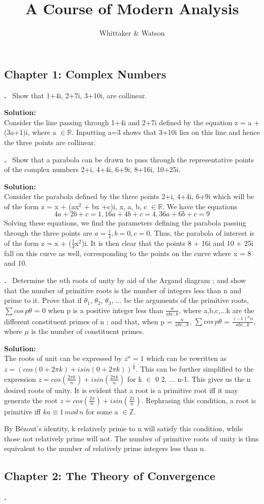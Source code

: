 \documentclass{article}
\date{}
\title{A Course of Modern Analysis}
\author{Whittaker \& Watson}
\newcommand{\R}{\mathbb{R}}
\newcounter{problem}
\newcounter{solution}
\newcommand\Problem{%
  \stepcounter{problem}%
  \textbf{\theproblem.}~%
  \setcounter{solution}{0}%
}
\newcommand\TheSolution{%
  \textbf{Solution:}\\%
}
\begin{document}
\maketitle
\subsection*{Chapter 1: Complex Numbers}
\Problem Show that 1+4i, 2+7i, 3+10i, are collinear.

\TheSolution Consider the line passing through 1+4i and 2+7i defined by the equation z = a + (3a+1)i, where a $\in\R$. Inputting a=3 shows that 3+10i lies on this line and hence the three points are collinear.

\Problem Show that a parabola can be drawn to pass through the representative points of the complex numbers 2+i, 4+4i, 6+9i, 8+16i, 10+25i.

\TheSolution Consider the parabola defined by the three points 2+i, 4+4i, 6+9i which will be of the form z = x + (ax$^2$ + bx +c)i, x, a, b, c $\in\R$. We have the equations
\[ 4a+2b+c = 1,  
16a + 4b +c = 4,  
36a + 6b + c = 9
\]
Solving these equations, we find the parameters defining the parabola passing through the three points are $a = \frac{1}{4}, b = 0, c= 0$. Thus, the parabola of interest is of the form z = x + ($\frac{1}{4}$x$^2$)i. It is then clear that the points 8 + 16i and 10 + 25i fall on this curve as well, corresponding to the points on the curve where x = 8 and 10.

\Problem Determine the $n$th roots of unity by aid of the Argand diagram ; and show that the number of primitive roots is the number of integers less than n and prime to it. Prove that if $\theta_1$, $\theta_2$, $\theta_3$, ... be the arguments of the primitive roots, $\sum cos\,p\theta$ = 0 when p is a positive integer less than $\frac{n}{abc..k}$, where a,b,c,...k are the different constituent primes of n ; and that, when p = $\frac{n}{abc...k}$, $\sum cos\,p\theta$ = $\frac{(-1)^\mu n}{abc...k}$, where $\mu$ is the number of constituent primes.

\TheSolution  The roots of unit can be expressed by $z^n = 1$ which can be rewritten as $z = (cos (0+2\pi k)+ i sin(0+2\pi k))^\frac{1}{n}$. This can be further simplified to the expression $z = cos(\frac{2\pi k}{n}) + i sin(\frac{2\pi k}{n})$ for k $\in$ 0 2, ... n-1. This gives us the n desired roots of unity. It is evident that a root is a primitive root iff it may generate the root $z = cos(\frac{2\pi }{n}) + i sin(\frac{2\pi }{n})$. Rephrasing this condition, a root is primitive iff $ka \equiv 1\,mod\,n$ for some a $\in \mathbb{Z}$. \par

By Bézout's identity, k relatively prime to n will satisfy this condition, while those not relatively prime will not. The number of primitive roots of unity is thus equivalent to the number of relatively prime integers less than n. \par


\subsection*{Chapter 2: The Theory of Convergence}
\setcounter{problem}{0}
\Problem
\end{document}
